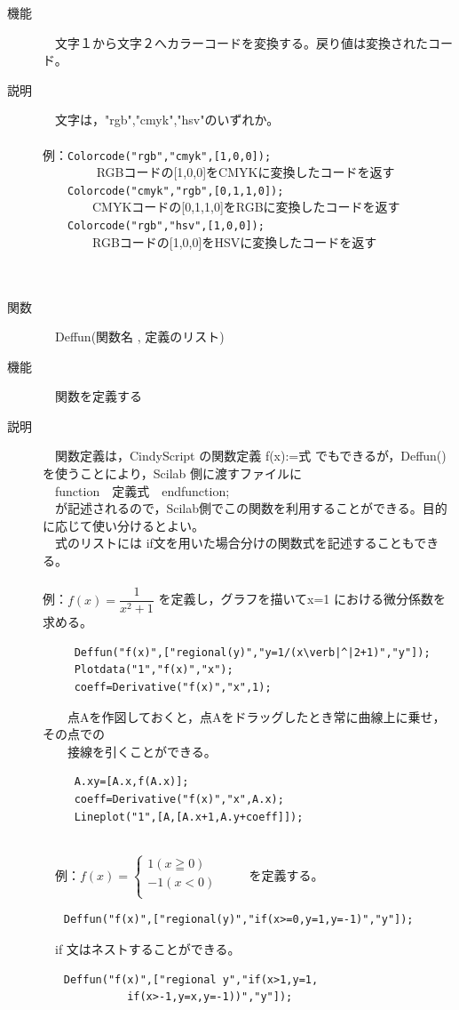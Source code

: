 \documentclass[papersize,a4paper,12pt,uplatex]{jsarticle}
\begin{document}
\begin{description}
\item[機能]　文字１から文字２へカラーコードを変換する。戻り値は変換されたコード。
\item[説明]　文字は，"rgb","cmyk","hsv"のいずれか。\\
　\\
例：\verb|Colorcode("rgb","cmyk",[1,0,0]); |\\
　　　 　RGBコードの[1,0,0]をCMYKに変換したコードを返す\\
　　\verb|Colorcode("cmyk","rgb",[0,1,1,0]);|\\
　　　　CMYKコードの[0,1,1,0]をRGBに変換したコードを返す\\
　　\verb|Colorcode("rgb","hsv",[1,0,0]);|\\
　　　　RGBコードの[1,0,0]をHSVに変換したコードを返す\\
　\\
　\\
\hypertarget{deffun}{}
\item[関数]　Deffun(関数名 , 定義のリスト)
\item[機能]　関数を定義する
\item[説明]　関数定義は，CindyScript の関数定義 f(x):=式 でもできるが，Deffun()を使うことにより，Scilab 側に渡すファイルに\\
　function　定義式　endfunction;\\
　が記述されるので，Scilab側でこの関数を利用することができる。目的に応じて使い分けるとよい。\\
　式のリストには if文を用いた場合分けの関数式を記述することもできる。\\
　\\
例：$f(x)=\dfrac{1}{x^2+1}$ を定義し，グラフを描いてx=1 における微分係数を求める。
\begin{verbatim}
　　　Deffun("f(x)",["regional(y)","y=1/(x\verb|^|2+1)","y"]);
　　　Plotdata("1","f(x)","x");
　　　coeff=Derivative("f(x)","x",1);
\end{verbatim}
　　点Aを作図しておくと，点Aをドラッグしたとき常に曲線上に乗せ，その点での\\
　　接線を引くことができる。
\begin{verbatim}
　　　A.xy=[A.x,f(A.x)];
　　　coeff=Derivative("f(x)","x",A.x);
　　　Lineplot("1",[A,[A.x+1,A.y+coeff]]);
\end{verbatim}
　　　　　\\

　例：$f(x)=\left\{\begin{array}{l}1 　(x\geqq 0)\\ -1 　(x<0)\\ \end{array}\right.$ 　　を定義する。
\begin{verbatim}
　　Deffun("f(x)",["regional(y)","if(x>=0,y=1,y=-1)","y"]);
\end{verbatim}
　if 文はネストすることができる。
\begin{verbatim}
　　Deffun("f(x)",["regional y","if(x>1,y=1,
　　　　　　　　if(x>-1,y=x,y=-1))","y"]);
\end{verbatim}
　\\



\end{description}
\end{document}
